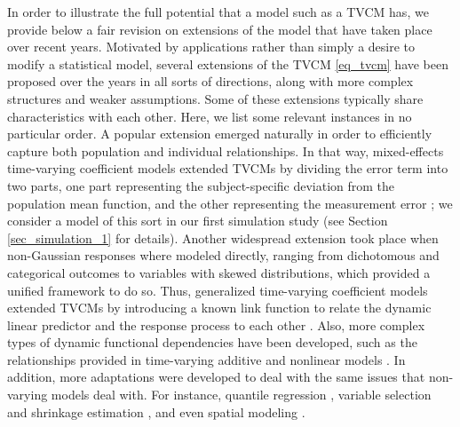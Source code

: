 \documentclass[letterpaper,10pt,openany]{article}
\begin{document}
{\color{black} In order to illustrate the full potential that a model such as a \textsf{TVCM} has, we provide below a fair revision on extensions of the model that have taken place over recent years.} Motivated by applications rather than simply a desire to modify a statistical model, several extensions of the \textsf{TVCM} \eqref{eq_tvcm} have been proposed over the years in all sorts of directions, along with more complex  structures and weaker assumptions. Some of these extensions typically share characteristics with each other. Here, we list some relevant instances in no particular order. A popular extension emerged naturally in order to efficiently capture both population and individual relationships. In that way, mixed-effects time-varying coefficient models extended \textsf{TVCM}s by dividing the error term into two parts, one part representing the subject-specific deviation from the population mean function, and the other representing the measurement error \citep{liang-2003-relationship, wu-2004-backfitting, lu-2009-smoothing, sosa-2012-random, chiou-2012-functional, jeong-2016-bayesian}; {\color{black} we consider a model of this sort in our first simulation study (see Section \ref{sec_simulation_1} for details).} Another widespread extension took place when non-Gaussian responses where modeled directly, ranging from dichotomous and categorical outcomes to variables with skewed distributions, which provided a unified framework to do so. Thus, generalized time-varying coefficient models extended \textsf{TVCM}s by introducing a known link function to relate the dynamic linear predictor and the response process to each other \citep{biller-2001-bayesian, cai-2000-efficient, csenturk-2008-generalized, lu-2009-smoothing,  csenturk-2013-modeling, lu-2017-bayesian, jeong-2017-analysis}. Also, more complex types of dynamic functional dependencies have been developed, such as the relationships provided in time-varying additive and nonlinear models \citep{fan-2003-adaptive, qu-2006-quadratic, wang-2007-varying, csenturk-2010-functional, wu-2013-nonparametric}. In addition, more adaptations were developed to deal with the same issues that non-varying models deal with. For instance, quantile regression \citep{wang-2009-quantile,andriyana-2018-quantile}, variable selection and shrinkage estimation \citep{fan-2005-profile,li-2008-variable,wang-2008-variable,wang-2009-shrinkage,wei-2011-variable}, and even spatial modeling \citep{assunccao-2003-space,gelfand-2003-spatial,waller-2007-quantifying,wu-2010-nonparametric,serban-2011-space,nobles-2014-spatial,jeong-2016-bayesian}.
\end{document}
